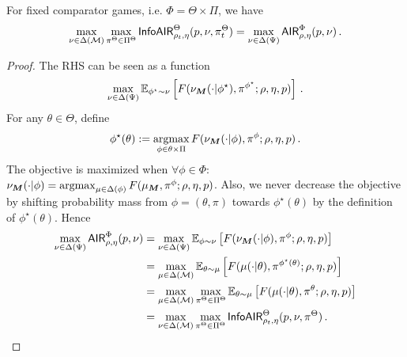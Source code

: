 \begin{lemma}\label{lem: max infoair to air}
    For fixed comparator games, i.e. $\Phi=\Theta\times\Pi$, we have 
$$\max_{\nu\in\Delta(\mathcal{M})}\max_{\pi^\Theta\in\Pi^\Theta}\mathsf{InfoAIR}^\Theta_{\rho_t,\eta}(p,\nu,\pi_t^\Theta)
=\max_{\nu\in\Delta(\Psi)}\mathsf{AIR}^{\Phi}_{\rho,\eta}(p,\nu)\,.$$
\end{lemma}
\begin{proof}
    The RHS can be seen as a function 
    \begin{align}
        \max_{\nu\in\Delta(\Psi)}\E_{\phi^\star\sim\nu}\left[F(\nu_{\bo{M}}(\cdot|\phi^\star),\pi^{\phi^\star};\rho,\eta,p)\right]\,.  \label{eq: obje}
    \end{align}
    For any $\theta\in\Theta$, define 
    \begin{align*}
        \phi^\star(\theta) := \argmax_{\phi\in \theta\times\Pi}F(\nu_{\bo{M}}(\cdot|\phi),\pi^{\phi};\rho,\eta,p)\,.
    \end{align*}
    The objective  is maximized when $\forall\phi\in\Phi$: 
    $\nu_{\bo{M}}(\cdot|\phi)=\argmax_{\mu\in\Delta(\phi)}F(\mu_{\bo{M}},\pi^{\phi};\rho,\eta,p)$.
    Also, we never decrease the objective by shifting probability mass from $\phi=(\theta,\pi)$ towards $\phi^\star(\theta)$ by the definition of $\phi^\star(\theta)$.
    Hence 
    \begin{align*}
        \max_{\nu\in\Delta(\Psi)}\air^{\Phi}_{\rho,\eta}(p,\nu
        )&=\max_{\nu\in\Delta(\Psi)}\E_{\phi\sim\nu}\left[F(\nu_{\bo{M}}(\cdot|\phi),\pi^{\phi};\rho,\eta,p)\right]
        \\&=\max_{\mu\in\Delta(\calM)}\E_{\theta\sim\mu}\left[F(\mu(\cdot|\theta),\pi^{\phi^\star(\theta)};\rho,\eta,p)\right]
        \\&=\max_{\mu\in\Delta(\calM)}\max_{\pi^\Theta\in\Pi^\Theta}\E_{\theta\sim\mu}\left[F(\mu(\cdot|\theta),\pi^{\theta};\rho,\eta,p)\right]
        \\&=\max_{\nu\in\Delta(\calM)}\max_{\pi^\Theta\in\Pi^\Theta}\infoair^\Theta_{\rho_t,\eta}(p,\nu,\pi^\Theta)\,.
    \end{align*}
\end{proof}
